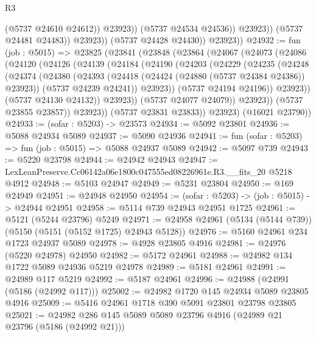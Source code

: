 \begin{lexlean}{R3}
\begin{coremodule}
                            (@5737 @24610 @24612))
                          @23923))
                      (@5737 @24534 @24536))
                    @23923))
                (@5737 @24481 @24483))
              @23923))
          (@5737 @24428 @24430))
        @23923))
@24932 := fun (job : @5015) =>
  @23825
    (@23841
      (@23848
        (@23864
          (@24067
            (@24073
              (@24086
                (@24120
                  (@24126
                    (@24139
                      (@24184
                        (@24190
                          (@24203
                            (@24229
                              (@24235
                                (@24248
                                  (@24374
                                    (@24380
                                      (@24393
                                        (@24418 (@24424 (@24880 (@5737 @24384 @24386)) @23923))
                                        (@5737 @24239 @24241))
                                      @23923))
                                  (@5737 @24194 @24196))
                                @23923))
                            (@5737 @24130 @24132))
                          @23923))
                      (@5737 @24077 @24079))
                    @23923))
                (@5737 @23855 @23857))
              @23923))
          (@5737 @23831 @23833))
        @23923)
      (@16021 @23790))
@24933 := (sofar : @5203) -> @23573
@24934 := @5092 @23801
@24936 := @5088 @24934 @5089
@24937 := @5090 @24936
@24941 := fun (sofar : @5203) => fun (job : @5015) => @5088 @24937 @5089
@24942 := @5097 @739
@24943 := @5220 @23798
@24944 := @24942 @24943
@24947 := LexLeanPreserve.Cc06142a06e1800c047555ed08226961e.R3.__fits_20 @5218 @4912
@24948 := @5103 @24947
@24949 := @5231 @23804
@24950 := @169 @24949
@24951 := @24948 @24950
@24954 := (sofar : @5203) -> (job : @5015) -> @24944 @24951
@24958 := @5114 @739 @24943 @24951 @1725
@24961 := @5121 (@5244 @23796) @5249
@24971 := @24958 @24961 (@5134 (@5144 @739)) (@5150 (@5151 (@5152 @1725) @24943 @5128))
@24976 := @5160 @24961 @234 @1723 @24937 @5089
@24978 := @4928 @23805 @4916
@24981 := @24976 (@5220 @24978) @24950
@24982 := @5172 @24961
@24988 := @24982 @134 @1722 @5089 @24936 @5219 @24978
@24989 := @5181 @24961
@24991 := @24989 @117 @5219
@24992 := @5187 @24961
@24996 := @24988 (@24991 (@5186 (@24992 @117)))
@25002 := @24982 @1720 @145 @24934 @5089 @23805 @4916
@25009 := @5416 @24961 @1718 @390 @5091 @23801 @23798 @23805
@25021 := @24982 @286 @145 @5089 @5089 @23796 @4916 (@24989 @21 @23796 (@5186 (@24992 @21)))

\end{coremodule}
\end{lexlean}
